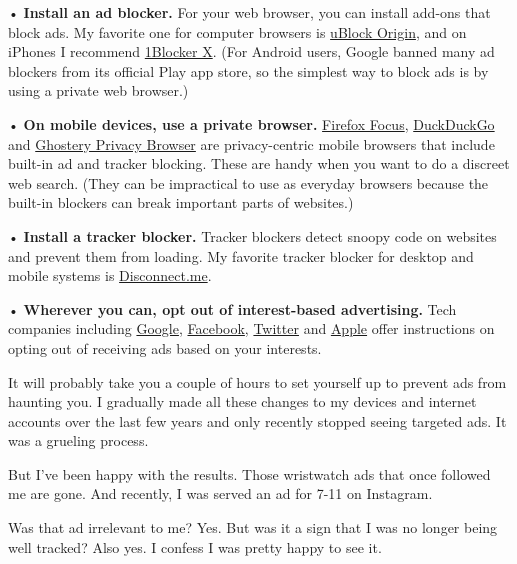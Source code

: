 • \textbf{Install an ad blocker.} For your web browser, you can install
add-ons that block ads. My favorite one for computer browsers is
\href{https://chrome.google.com/webstore/detail/ublock-origin/cjpalhdlnbpafiamejdnhcphjbkeiagm?hl=en}{uBlock
Origin}, and on iPhones I recommend
\href{https://itunes.apple.com/us/app/1blocker-x/id1365531024?mt=8}{1Blocker
X}. (For Android users, Google banned many ad blockers from its official
Play app store, so the simplest way to block ads is by using a private
web browser.)

• \textbf{On mobile devices, use a private browser.}
\href{https://www.mozilla.org/en-US/firefox/mobile/\#mobile-download-buttons-focus}{Firefox
Focus},
\href{https://play.google.com/store/apps/details?id=com.duckduckgo.mobile.android\&hl=en_US}{DuckDuckGo}
and
\href{https://itunes.apple.com/us/app/ghostery-privacy-browser/id472789016?mt=8}{Ghostery
Privacy Browser} are privacy-centric mobile browsers that include
built-in ad and tracker blocking. These are handy when you want to do a
discreet web search. (They can be impractical to use as everyday
browsers because the built-in blockers can break important parts of
websites.)

• \textbf{Install a tracker blocker.} Tracker blockers detect snoopy
code on websites and prevent them from loading. My favorite tracker
blocker for desktop and mobile systems is
\href{https://disconnect.me/}{Disconnect.me}.

• \textbf{Wherever you can, opt out of interest-based advertising.} Tech
companies including
\href{https://support.google.com/ads/answer/2662922?hl=en}{Google},
\href{https://www.facebook.com/help/1075880512458213/?helpref=hc_fnav}{Facebook},
\href{https://business.twitter.com/en/help/ads-policies/other-policy-requirements/interest-based-opt-out-policy.html}{Twitter}
and \href{https://support.apple.com/en-us/HT202074}{Apple} offer
instructions on opting out of receiving ads based on your interests.

It will probably take you a couple of hours to set yourself up to
prevent ads from haunting you. I gradually made all these changes to my
devices and internet accounts over the last few years and only recently
stopped seeing targeted ads. It was a grueling process.

But I've been happy with the results. Those wristwatch ads that once
followed me are gone. And recently, I was served an ad for 7-11 on
Instagram.

Was that ad irrelevant to me? Yes. But was it a sign that I was no
longer being well tracked? Also yes. I confess I was pretty happy to see
it.

